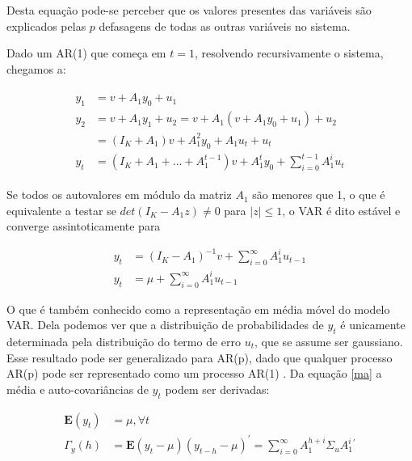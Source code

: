 \documentclass[a4paper,
               article,
               12pt,
               openany,
               oneside,
               english,
               brazil]{abntex2}
\numberwithin{equation}{section}
\begin{document}
    Desta equação pode-se perceber que os valores presentes das variáveis são explicados pelas $ p $ defasagens de todas as outras variáveis no sistema.

    Dado um AR(1) que começa em $ t = 1 $, resolvendo recursivamente o sistema, chegamos a:

    \begin{align}
        \label{VAR1}
        \begin{aligned}
        y_1 &= v + A_1 y_0 + u_1 \\
        y_2 &= v + A_1 y_1 + u_2 = v + A_1(v + A_1y_0 + u_1) + u_2 \\
            &= (I_K + A_1)v + A^{2}_1 y_0 + A_1 u_t + u_t \\
        y_t &= (I_K + A_1 + \dots + A^{t-1}_1)v + A^{t}_1 y_0 + \sum^{t-1}_{i=0} A^{i}_1 u_t
        \end{aligned}
    \end{align}

    Se todos os autovalores em módulo da matriz $ A_1 $ são menores que 1, o que é equivalente a testar se $ det(I_{K} - A_1z) \neq 0 $ para $ \lvert z \rvert \leq 1 $, o VAR é dito estável e converge assintoticamente para

    \begin{equation}
        \label{ma}
        \begin{aligned}
        y_t &= (I_K - A_1)^{-1} v + \sum^{\infty}_{i=0} A^{i}_1 u_{t-1} \\
        y_t &= \mu + \sum^{\infty}_{i=0} A^{i}_1 u_{t-1}
        \end{aligned}
    \end{equation}

    O que é também conhecido como a representação em média móvel do modelo VAR\@ \cite[18]{lutkepool}. Dela podemos ver que a distribuição de probabilidades de $ y_t $ é unicamente determinada pela distribuição do termo de erro $ u_t $, que se assume ser gaussiano. Esse resultado pode ser generalizado para AR(p), dado que qualquer processo AR(p) pode ser representado como um processo AR(1) \cite[p.~15]{lutkepool}. Da equação \eqref{ma} a média e auto-covariâncias de $ y_t $ podem ser derivadas: 

    \begin{align*}
        \label{momentos}
        \mathbf{E}(y_t) &= \mu, \forall t \\
        \Gamma_y (h) &= \mathbf{E}(y_t - \mu)(y_{t-h} - \mu)^{'} = \sum_{i=0}^{\infty} A_1^{h+i} \Sigma_u A_1^{i}^{'} \\
    \end{align*}
\end{document}
